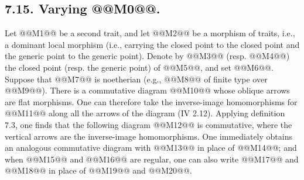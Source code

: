 \subsection*{7.15. Varying @@M0@@.}
Let @@M1@@ be a second trait, and let
@@M2@@
be a morphism of traits, i.e., a dominant local morphism (i.e., carrying the closed point to the closed point and the generic point to the generic point). Denote by @@M3@@ (resp. @@M4@@) the closed point (resp. the generic point) of @@M5@@, and set @@M6@@. Suppose that @@M7@@ is noetherian (e.g., @@M8@@ of finite type over @@M9@@). There is a commutative diagram
@@M10@@
whose oblique arrows are flat morphisms. One can therefore take the inverse-image homomorphisms for @@M11@@ along all the arrows of the diagram (IV 2.12). Applying definition 7.3, one finds that the following diagram
@@M12@@
is commutative, where the vertical arrows are the inverse-image homomorphisms. One immediately obtains an analogous commutative diagram with @@M13@@ in place of @@M14@@; and when @@M15@@ and @@M16@@ are regular, one can also write @@M17@@ and @@M18@@ in place of @@M19@@ and @@M20@@.

